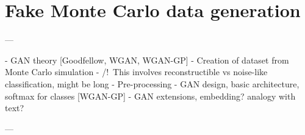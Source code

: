 \chapter{Fake Monte Carlo data generation}
\begin{markdown}
---

- GAN theory [Goodfellow, WGAN, WGAN-GP]
- Creation of dataset from Monte Carlo simulation
 - /!\ This involves reconstructible vs noise-like classification, might be long
 - Pre-processing
- GAN design, basic architecture, softmax for classes [WGAN-GP]
- GAN extensions, embedding? analogy with text?

---
\end{markdown}
\section{}

